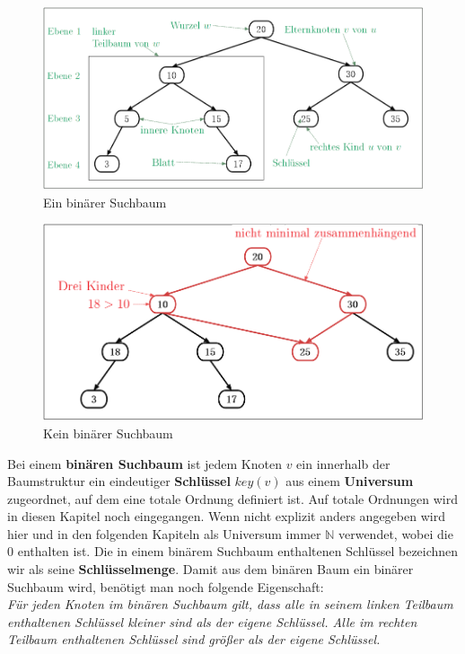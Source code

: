 \documentclass[a4paper,12pt]{article}
\begin{document}
\begin{figure}[h]
	\centering
	\includegraphics[width= 1\textwidth]{"Medien/Einleitung/ioSuchbaum"}
	\caption{Ein binärer Suchbaum }
	\label{fig:ioSuchbaum}
\end{figure}
\begin{figure}[h]
	\centering
	\includegraphics[width= 1\textwidth]{"Medien/Einleitung/nioSuchbaum"}
	\caption{Kein binärer Suchbaum }
	\label{fig:nioSuchbaum}
\end{figure}

\noindent Bei einem \textbf{binären Suchbaum} ist jedem Knoten $v$ ein innerhalb der Baumstruktur ein eindeutiger \textbf{Schlüssel} $\mathit{key}\left(v\right)$ aus einem \textbf{Universum} zugeordnet, auf dem eine totale Ordnung definiert ist. Auf totale Ordnungen wird in diesen Kapitel noch eingegangen. Wenn nicht explizit anders angegeben wird hier und in den folgenden Kapiteln als Universum immer $\mathbb{N}$ verwendet, wobei die $0$ enthalten ist. Die in einem binärem Suchbaum enthaltenen Schlüssel bezeichnen wir als seine \textbf{Schlüsselmenge}.  Damit aus dem binären Baum ein binärer Suchbaum wird, benötigt man noch folgende Eigenschaft:\\
\textit{Für jeden Knoten im binären Suchbaum gilt, dass alle in seinem linken Teilbaum enthaltenen Schlüssel kleiner sind als der eigene Schlüssel. Alle im rechten Teilbaum enthaltenen Schlüssel sind größer als der eigene Schlüssel.} \\
\end{document}
